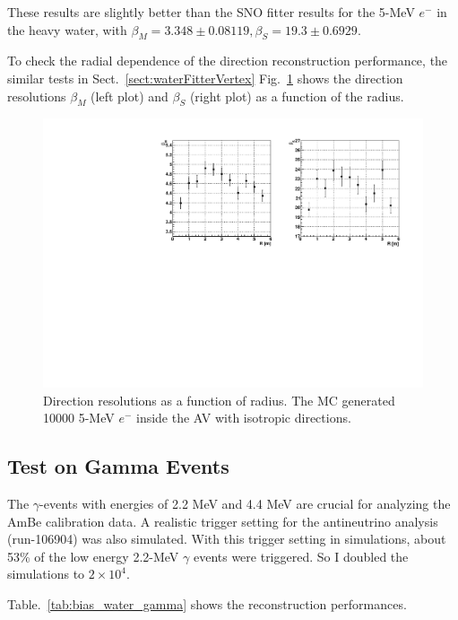 These results are slightly better than the SNO fitter results for the 5-MeV $e^-$ in the heavy water, with $\beta_M=3.348\pm 0.08119, \beta_S=19.3\pm 0.6929$\cite{boulay2004direct}.

To check the radial dependence of the direction reconstruction performance, the similar tests in Sect.~\ref{sect:waterFitterVertex}
Fig.~\ref{fig:diResolVsShell_5MeV} shows the direction resolutions $\beta_M$ (left plot) and $\beta_S$ (right plot) as a function of the radius.
\begin{figure}[htbp]
	\centering
	\includegraphics[width=14cm]{DirResolVsShell.pdf}
	\caption[Direction resolutions as a function of radius.]{Direction resolutions as a function of radius. The MC generated 10000 5-MeV $e^-$ inside the AV with isotropic directions.\label{fig:diResolVsShell_5MeV}}
\end{figure}

\subsection{Test on Gamma Events}

The $\gamma$-events with energies of 2.2 MeV and 4.4 MeV are crucial for analyzing the AmBe calibration data. A realistic trigger setting for the antineutrino analysis (run-106904) was also simulated. 
With this trigger setting in simulations, about 53\% of the low energy 2.2-MeV $\gamma$ events were triggered. So I doubled the simulations to $2\times10^4$.

Table.~\ref{tab:bias_water_gamma} shows the reconstruction performances.

